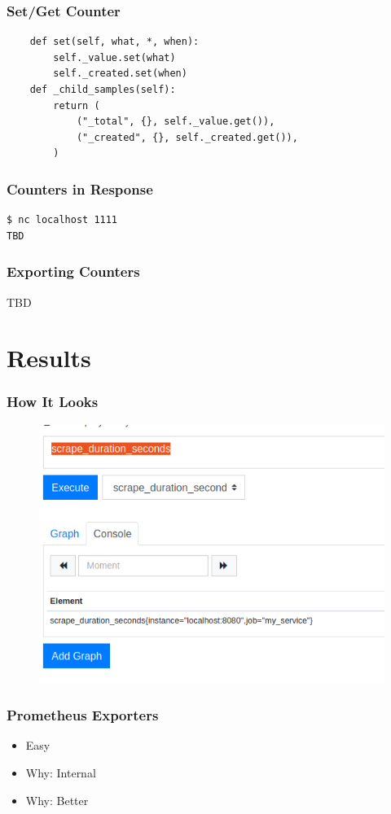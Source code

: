 \begin{frame}[fragile]
\frametitle{Set/Get Counter}
\begin{lstlisting}
    def set(self, what, *, when):
        self._value.set(what)
        self._created.set(when)
    def _child_samples(self):
        return (
            ("_total", {}, self._value.get()),
            ("_created", {}, self._created.get()),
        )
\end{lstlisting}
\end{frame}

\begin{frame}
\frametitle{Counters in Response}

\begin{lstlisting}
$ nc localhost 1111
TBD
\end{lstlisting}
\end{frame}

\begin{frame}
\frametitle{Exporting Counters}
TBD
\end{frame}

\section{Results}

\begin{frame}[fragile]
\frametitle{How It Looks}

\begin{figure}
\includegraphics[scale=0.25]{prometheus}
\end{figure}

\end{frame}

\begin{frame}
\frametitle{Prometheus Exporters}

\begin{itemize}
\item Easy\pause
\item Why: Internal\pause
\item Why: Better
\end{itemize}

\end{frame}


